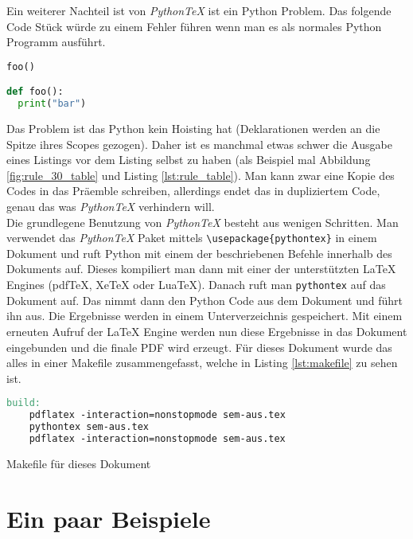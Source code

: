 \documentclass[11pt,a4paper]{article}
\newcommand{\pythontex}{\textit{Python\TeX{}}}
\begin{document}
%
Ein weiterer Nachteil ist von \pythontex{} ist ein Python Problem.
%
Das folgende Code Stück würde zu einem Fehler führen wenn man es als normales Python Programm ausführt.
%
\begin{lstlisting}[language=Python]
foo()

def foo():
  print("bar")
\end{lstlisting}
%
Das Problem ist das Python kein Hoisting hat (Deklarationen werden an die Spitze ihres Scopes gezogen).
%
Daher ist es manchmal etwas schwer die Ausgabe eines Listings vor dem Listing selbst zu haben (als Beispiel mal Abbildung \ref{fig:rule_30_table} und Listing \ref{lst:rule_table}).
%
Man kann zwar eine Kopie des Codes in das Präemble schreiben, allerdings endet das in dupliziertem Code, genau das was \pythontex{} verhindern will.
%
\\
%
Die grundlegene Benutzung von \pythontex{} besteht aus wenigen Schritten.
%
Man verwendet das \pythontex{} Paket mittels \verb#\usepackage{pythontex}# in einem Dokument und ruft Python mit einem der beschriebenen Befehle innerhalb des Dokuments auf.
%
Dieses kompiliert man dann mit einer der unterstützten \LaTeX{} Engines (pdf\TeX{}, Xe\TeX{} oder Lua\TeX{}).
%
Danach ruft man \texttt{pythontex} auf das Dokument auf.
%
Das nimmt dann den Python Code aus dem Dokument und führt ihn aus.
%
Die Ergebnisse werden in einem Unterverzeichnis gespeichert.
%
Mit einem erneuten Aufruf der \LaTeX{} Engine werden nun diese Ergebnisse in das Dokument eingebunden und die finale PDF wird erzeugt.
%
Für dieses Dokument wurde das alles in einer Makefile zusammengefasst, welche in Listing \ref{lst:makefile} zu sehen ist.
%
\begin{listing}
  \begin{lstlisting}[language=make,columns=flexible]
build:
	pdflatex -interaction=nonstopmode sem-aus.tex
	pythontex sem-aus.tex
	pdflatex -interaction=nonstopmode sem-aus.tex
  \end{lstlisting}
  \caption{Makefile für dieses Dokument}
  \label{lst:makefile}
\end{listing}
%
\section{Ein paar Beispiele}
\end{document}
